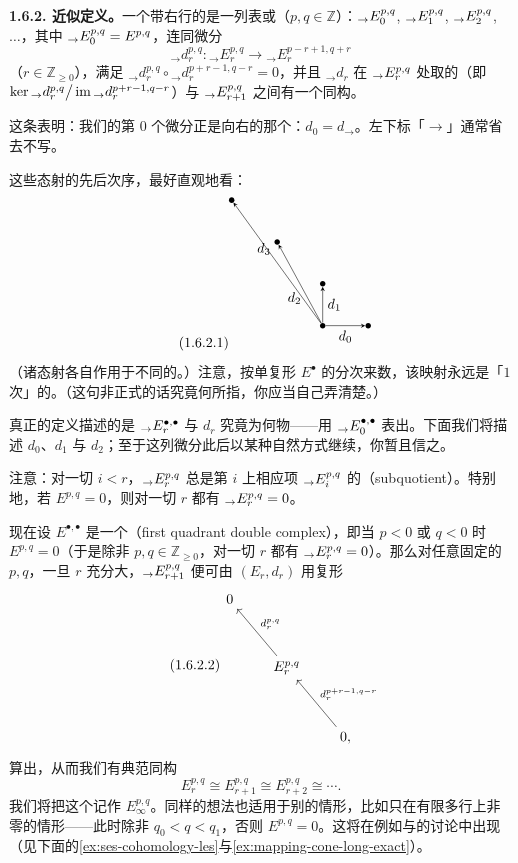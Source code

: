 \textbf{1.6.2. 近似定义。}\quad 一个带右行\trOrientation{}的\trSpectralSequence{}是一列表或\trPage{}（$p,q\in\mathbb{Z}$）：${}_{\to}E^{p,q}_{0}$, ${}_{\to}E^{p,q}_{1}$, ${}_{\to}E^{p,q}_{2}$, $\dots$，其中 ${}_{\to}E^{p,q}_{0}=E^{p,q}$，连同微分
\[
{}_{\to}d^{p,q}_{r}\colon {}_{\to}E^{p,q}_{r}\longrightarrow{}_{\to}E^{p-r+1,q+r}_{r}
\]
（$r\in\mathbb{Z}_{\ge0}$），满足 ${}_{\to}d^{p,q}_{r}\circ{}_{\to}d^{p+r-1,q-r}_{r}=0$，并且 ${}_{\to}d_{r}$ 在 ${}_{\to}E^{p,q}_{r}$ 处取的\trCohomology（即 $\ker{}_{\to}d^{p,q}_{r}\big/\operatorname{im}{}_{\to}d^{p+r-1,q-r}_{r}$）与 ${}_{\to}E^{p,q}_{r+1}$ 之间有一个同构。

这条\trOrientation{}表明：我们的第 $0$ 个微分正是向右的那个：$d_{0}=d_{\to}$。左下标「$\to$」通常省去不写。

这些态射的先后次序，最好直观地看：
\begin{equation*}\tag{1.6.2.1}\label{eq:ss-right-arrows}
\begin{tikzpicture}[>=stealth,dot/.style={circle,fill,inner sep=1.4pt}]
  \node[dot] (o)  at (0,0)       {};
  \node[dot] (t0) at (1.15,0)    {};
  \node[dot] (t1) at (0,1.05)    {};
  \node[dot] (t2) at (-1.15,2.1) {};
  \node[dot] (t3) at (-2.3,3.15) {};
  \draw[->] (o) -- (t0) node[midway,below] {$d_0$};
  \draw[->] (o) -- (t1) node[midway,right] {$d_1$};
  \draw[->] (o) -- (t2) node[pos=0.42,below left=-2pt] {$d_2$};
  \draw[->] (o) -- (t3) node[pos=0.55,above left=-2pt] {$d_3$};
\end{tikzpicture}
\end{equation*}
（诸态射各自作用于不同的\trPage。）注意，按单复形 $E^{\bullet}$ 的分次来数，该映射永远是「$1$ 次」的。（这句非正式的话究竟何所指，你应当自己弄清楚。）

真正的定义描述的是 ${}_{\to}E^{\bullet,\bullet}_{r}$ 与 $d_{r}$ 究竟为何物——用 ${}_{\to}E^{\bullet,\bullet}_{0}$ 表出。下面我们将描述 $d_{0}$、$d_{1}$ 与 $d_{2}$；至于这列微分此后以某种自然方式继续，你暂且信之。

注意：对一切 $i<r$，${}_{\to}E^{p,q}_{r}$ 总是第 $i$ \trPage{}上相应项 ${}_{\to}E^{p,q}_{i}$ 的\textbf{\trSubquotient}（subquotient）。特别地，若 $E^{p,q}=0$，则对一切 $r$ 都有 ${}_{\to}E^{p,q}_{r}=0$。

现在设 $E^{\bullet,\bullet}$ 是一个\textbf{\trFirstQuadrant\trDoubleComplex}（first quadrant double complex），即当 $p<0$ 或 $q<0$ 时 $E^{p,q}=0$（于是除非 $p,q\in\mathbb{Z}_{\ge0}$，对一切 $r$ 都有 ${}_{\to}E^{p,q}_{r}=0$）。那么对任意固定的 $p,q$，一旦 $r$ 充分大，${}_{\to}E^{p,q}_{r+1}$ 便可由 $(E_{r},d_{r})$ 用复形
\begin{equation*}\tag{1.6.2.2}\label{eq:ss-stable-term-complex}
\begin{tikzcd}[row sep=3.4em, column sep=2.0em]
0 \\
   & E^{p,q}_{r} \ar[ul,"d^{p,q}_{r}"'] \\
   &    & 0, \ar[ul,"d^{p+r-1,q-r}_{r}"']
\end{tikzcd}
\end{equation*}
算出，从而我们有典范同构
\[
E^{p,q}_{r}\cong E^{p,q}_{r+1}\cong E^{p,q}_{r+2}\cong\cdots.
\]
我们将把这个\trModule{}记作 $E^{p,q}_{\infty}$。同样的想法也适用于别的情形，比如\trDoubleComplex{}只在有限多行上非零的情形——此时除非 $q_{0}<q<q_{1}$，否则 $E^{p,q}=0$。这将在例如\trMappingCone{}与\trLongExactSequence{}的讨论中出现（见下面的\cref{ex:ses-cohomology-les}与\cref{ex:mapping-cone-long-exact}）。

